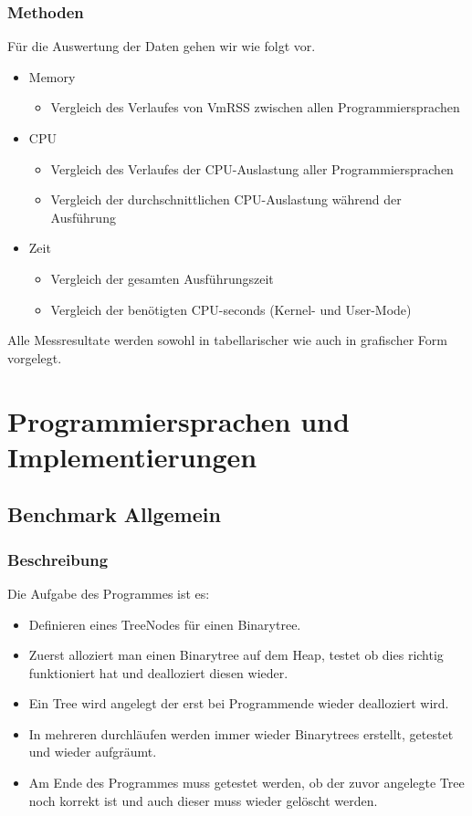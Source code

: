 \documentclass{fancydocument}
\begin{document}
\subsubsection{Methoden}
Für die Auswertung der Daten gehen wir wie folgt vor.
\begin{itemize}
\item Memory
\begin{itemize}
\item Vergleich des Verlaufes von VmRSS zwischen allen Programmiersprachen
\end{itemize}
\item CPU
\begin{itemize}
\item Vergleich des Verlaufes der CPU-Auslastung aller Programmiersprachen
\item Vergleich der durchschnittlichen CPU-Auslastung während der Ausführung
\end{itemize}
\item Zeit
\begin{itemize}
\item Vergleich der gesamten Ausführungszeit
\item Vergleich der benötigten CPU-seconds (Kernel- und User-Mode)
\end{itemize}
\end{itemize}
Alle Messresultate werden sowohl in tabellarischer wie auch in grafischer Form vorgelegt.
\section{Programmiersprachen und Implementierungen}

\subsection{Benchmark Allgemein}

\subsubsection{Beschreibung}

Die Aufgabe des Programmes ist es:
\begin{itemize}
\item Definieren eines TreeNodes f\"ur einen Binarytree.
\item Zuerst alloziert man einen Binarytree auf dem Heap, testet ob dies
  richtig funktioniert hat und dealloziert diesen wieder.
\item Ein Tree wird angelegt der erst bei Programmende
  wieder dealloziert wird.
\item In mehreren durchläufen werden immer wieder Binarytrees
  erstellt, getestet und wieder aufgr\"aumt.
\item Am Ende des Programmes muss getestet werden, ob der zuvor
  angelegte Tree noch korrekt ist und auch dieser muss wieder
  gel\"oscht werden.
\end{itemize}
\end{document}
